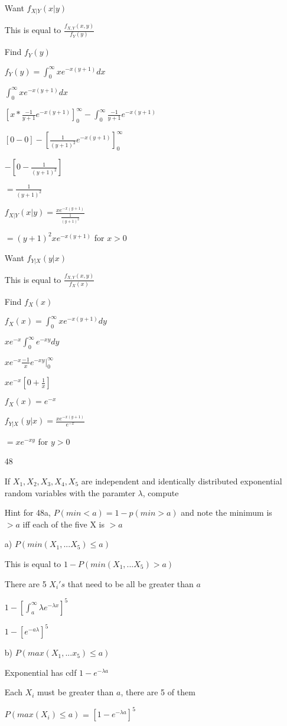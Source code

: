\documentclass[11pt]{article}
\begin{document}
\begin{itemize}
Want $f_{X|Y}(x|y)$

This is equal to $\frac{f_{X,Y}(x,y)}{f_Y(y)}$

Find $f_Y(y)$

$f_Y(y) = \int_0^{\infty} xe^{-x(y + 1)} dx$

$\int_0^{\infty} xe^{-x(y+1)} dx$

$[x* \frac{-1}{y + 1} e^{-x(y+1)}]_0^{\infty} - \int_0^{\infty} \frac{-1}{y+1} e^{-x(y+1)}$

$[0 - 0] - [\frac{1}{(y+1)^2} e^{-x(y+1)}]_0^{\infty}$

$-[0 - \frac{1}{(y+1)^2}]$

$=\frac{1}{(y+1)^2}$

$f_{X|Y}(x|y) = \frac{xe^{-x(y+1)}}{\frac{1}{(y+1)^2}}$

$= (y+1)^2 xe^{-x(y+1)}$ for $x > 0$

Want $f_{Y|X}(y|x)$

This is equal to $\frac{f_{X,Y}(x,y)}{f_X(x)}$

Find $f_X(x)$

$f_X(x) = \int_0^{\infty} xe^{-x(y+1)} dy$

$xe^{-x} \int_0^{\infty} e^{-xy}dy$

$xe^{-x} \frac{-1}{x} e^{-xy}|_0^{\infty}$

$xe^{-x}[0 + \frac{1}{x}]$

$f_X(x) = e^{-x}$

$f_{Y|X}(y|x) = \frac{xe^{-x(y+1)}}{e^{-x}}$

$=xe^{-xy}$ for $y > 0$

\item[48]

If $X_1, X_2, X_3, X_4, X_5$ are independent and identically distributed exponential random variables with the paramter $\lambda$, compute

Hint for 48a, $P(min < a) = 1 - p(min > a)$ and note the minimum is $>a$ iff each of the five X is $>a$

a) $P(min(X_1,...X_5) \leq a)$

This is equal to $1 - P(min(X_1,...X_5) > a)$

There are 5 $X_i's$ that need to be all be greater than $a$

$1 - [\int_a^{\infty} \lambda e^{-\lambda x}]^5$

$1 - [e^{-a\lambda}]^5$

b) $P(max(X_1,...x_5) \leq a)$

Exponential has cdf $1-e^{-\lambda a}$

Each $X_i$ must be greater than $a$, there are 5 of them

$P(max(X_i) \leq a)$ = $[1 - e^{-\lambda a}]^5$

\end{itemize}
\end{document}
